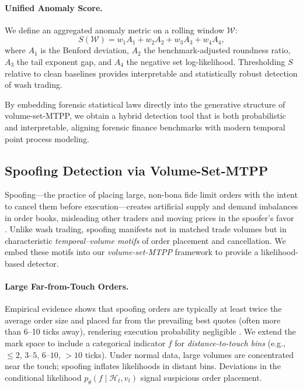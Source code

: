 \paragraph{Unified Anomaly Score.}
We define an aggregated anomaly metric on a rolling window $\mathcal{W}$:
\[
S(\mathcal{W}) = w_1A_1 + w_2A_2 + w_3A_3 + w_4A_4,
\]
where $A_1$ is the Benford deviation, $A_2$ the benchmark-adjusted roundness ratio, $A_3$ the tail exponent gap, and $A_4$ the negative set log-likelihood. Thresholding $S$ relative to clean baselines provides interpretable and statistically robust detection of wash trading.

\noindent By embedding forensic statistical laws directly into the generative structure of volume-set-MTPP, we obtain a hybrid detection tool that is both probabilistic and interpretable, aligning forensic finance benchmarks with modern temporal point process modeling.


\subsection{Spoofing Detection via Volume-Set-MTPP}
\label{subsec:spoof-mtpp}

Spoofing---the practice of placing large, non-bona fide limit orders with the intent to cancel them before execution---creates artificial supply and demand imbalances in order books, misleading other traders and moving prices in the spoofer’s favor \cite{Lee2013,Tao2022}. Unlike wash trading, spoofing manifests not in matched trade volumes but in characteristic \emph{temporal--volume motifs} of order placement and cancellation. We embed these motifs into our \emph{volume-set-MTPP} framework to provide a likelihood-based detector.

\paragraph{Large Far-from-Touch Orders.}
Empirical evidence shows that spoofing orders are typically at least twice the average order size and placed far from the prevailing best quotes (often more than 6--10 ticks away), rendering execution probability negligible \cite{Lee2013}. We extend the mark space to include a categorical indicator $f$ for \emph{distance-to-touch bins} (e.g., $\leq 2$, $3$--$5$, $6$--$10$, $>10$ ticks). Under normal data, large volumes are concentrated near the touch; spoofing inflates likelihoods in distant bins. Deviations in the conditional likelihood $p_\theta(f \mid \mathcal{H}_t, v_t)$ signal suspicious order placement.

